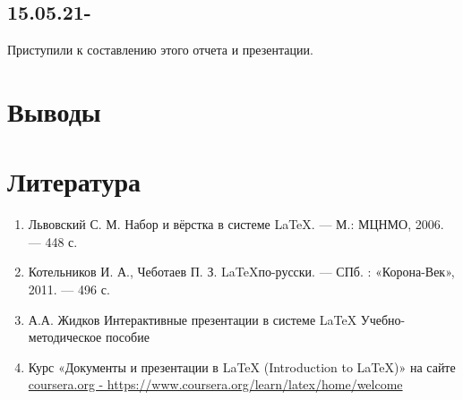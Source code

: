 \documentclass[14pt, a4paper]{extarticle}
\begin{document}
\subsection{15.05.21-}
Приступили к составлению этого отчета и презентации.



\section{Выводы}


\section{Литература}
\begin{enumerate} 
\item Львовский С. М. Набор и вёрстка в системе \LaTeX. — М.: МЦНМО, 2006. — 448 с.
\item Котельников И. А., Чеботаев П. З. \LaTeX по-русски. — СПб. : «Корона-Век», 2011. — 496 с.
\item А.А. Жидков Интерактивные презентации в системе \LaTeX
Учебно-методическое пособие
\item Курс «Документы и презентации в LaTeX (Introduction to \LaTeX)» на сайте \url{coursera.org - https://www.coursera.org/learn/latex/home/welcome}
\end{enumerate}
\end{document}

